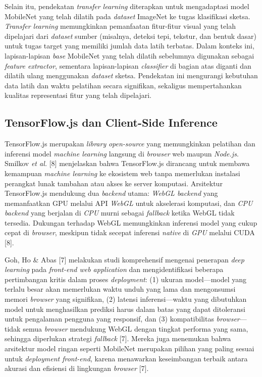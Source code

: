 \documentclass[12pt,oneside]{report}
\begin{document}
Selain itu, pendekatan \textit{transfer learning} diterapkan untuk mengadaptasi model MobileNet yang telah dilatih pada \textit{dataset} ImageNet ke tugas klasifikasi sketsa. \textit{Transfer learning} memungkinkan pemanfaatan fitur-fitur visual yang telah dipelajari dari \textit{dataset} sumber (misalnya, deteksi tepi, tekstur, dan bentuk dasar) untuk tugas target yang memiliki jumlah data latih terbatas. Dalam konteks ini, lapisan-lapisan \textit{base} MobileNet yang telah dilatih sebelumnya digunakan sebagai \textit{feature extractor}, sementara lapisan-lapisan \textit{classifier} di bagian atas diganti dan dilatih ulang menggunakan \textit{dataset} sketsa. Pendekatan ini mengurangi kebutuhan data latih dan waktu pelatihan secara signifikan, sekaligus mempertahankan kualitas representasi fitur yang telah dipelajari.

\subsection{TensorFlow.js dan Client-Side Inference}
\label{subsec:tfjs-client-side}

TensorFlow.js merupakan \textit{library} \textit{open-source} yang memungkinkan pelatihan dan inferensi model \textit{machine learning} langsung di \textit{browser} web maupun \textit{Node.js}. Smilkov \textit{et al.} [8] menjelaskan bahwa TensorFlow.js dirancang untuk membawa kemampuan \textit{machine learning} ke ekosistem web tanpa memerlukan instalasi perangkat lunak tambahan atau akses ke server komputasi. Arsitektur TensorFlow.js mendukung dua \textit{backend} utama: \textit{WebGL backend} yang memanfaatkan GPU melalui API \textit{WebGL} untuk akselerasi komputasi, dan \textit{CPU backend} yang berjalan di \textit{CPU} murni sebagai \textit{fallback} ketika WebGL tidak tersedia. Dukungan terhadap WebGL memungkinkan inferensi model yang cukup cepat di \textit{browser}, meskipun tidak secepat inferensi \textit{native} di \textit{GPU} melalui CUDA [8].

Goh, Ho \& Abas [7] melakukan studi komprehensif mengenai penerapan \textit{deep learning} pada \textit{front-end web application} dan mengidentifikasi beberapa pertimbangan kritis dalam proses \textit{deployment}: (1) ukuran model—model yang terlalu besar akan memerlukan waktu unduh yang lama dan mengonsumsi memori \textit{browser} yang signifikan, (2) latensi inferensi—waktu yang dibutuhkan model untuk menghasilkan prediksi harus dalam batas yang dapat ditoleransi untuk pengalaman pengguna yang responsif, dan (3) kompatibilitas \textit{browser}—tidak semua \textit{browser} mendukung WebGL dengan tingkat performa yang sama, sehingga diperlukan strategi \textit{fallback} [7]. Mereka juga menemukan bahwa arsitektur model ringan seperti MobileNet merupakan pilihan yang paling sesuai untuk \textit{deployment front-end}, karena menawarkan keseimbangan terbaik antara akurasi dan efisiensi di lingkungan \textit{browser} [7].
\end{document}
